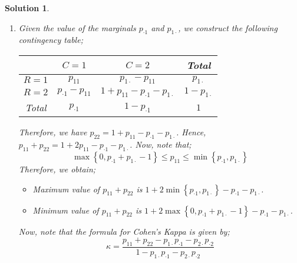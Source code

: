 \documentclass[12pt]{article}
\theoremstyle{problemstyle}
\newtheorem*{solution*}{Solution}
\begin{document}
\begin{solution*}
\begin{enumerate}
	\item[(a)] Given the value of the marginals $p_{\cdot 1}$ and $p_{1\cdot}$, we construct the following contingency table;
	\begin{table}[H]
		\centering 
		\begin{tabular}{cccc}
			\toprule
			& $C=1$ & $C=2$ & Total\\
			\midrule 
			$R = 1$ & $p_{11}$ & $p_{1\cdot} - p_{11}$ & $p_{1\cdot}$\\
			$R=2$ & $p_{\cdot 1} - p_{11}$ & $1 + p_{11} - p_{\cdot 1} - p_{1\cdot}$ & $1 - p_{1\cdot}$\\
			\midrule
			Total & $p_{\cdot 1}$ & $1 - p_{\cdot 1}$ & $1$\\
			\bottomrule
		\end{tabular}	
	\end{table}
	Therefore, we have $p_{22} = 1 + p_{11} - p_{\cdot 1} - p_{1\cdot}$. Hence, $p_{11} + p_{22} = 1 + 2p_{11} - p_{\cdot 1} - p_{1\cdot}$. Now, note that;
	$$\max\left\{0, p_{\cdot 1} +  p_{1\cdot} - 1\right\} \leq p_{11} \leq \min\left\{p_{\cdot 1}, p_{1\cdot}\right\}$$
	Therefore, we obtain;
	\begin{itemize}
		\item Maximum value of $p_{11} + p_{22}$ is $1 + 2\min\left\{p_{\cdot 1}, p_{1\cdot}\right\} - p_{\cdot 1} - p_{1\cdot}$.
		\item Minimum value of $p_{11} + p_{22}$ is $1 + 2\max\left\{0, p_{\cdot 1} +  p_{1\cdot} - 1\right\} - p_{\cdot 1} - p_{1\cdot}$.
	\end{itemize}
	
	Now, note that the formula for Cohen's Kappa is given by;
	$$\kappa = \dfrac{p_{11} + p_{22} - p_{1\cdot}p_{\cdot 1} - p_{2\cdot}p_{\cdot 2}}{1 - p_{1\cdot}p_{\cdot 1} - p_{2\cdot}p_{\cdot 2} }$$
	

\end{enumerate}
\end{solution*}
\end{document}
